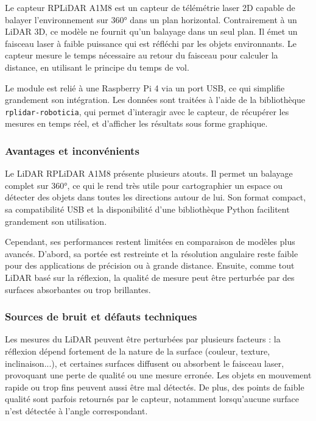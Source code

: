 Le capteur RPLiDAR A1M8 est un capteur de télémétrie laser 2D capable de balayer l’environnement sur 360° dans un plan horizontal. Contrairement à un LiDAR 3D, ce modèle ne fournit qu’un balayage dans un seul plan. Il émet un faisceau laser à faible puissance qui est réfléchi par les objets environnants. Le capteur mesure le temps nécessaire au retour du faisceau pour calculer la distance, en utilisant le principe du temps de vol.

Le module est relié à une Raspberry Pi 4 via un port USB, ce qui simplifie grandement son intégration. Les données sont traitées à l’aide de la bibliothèque \texttt{rplidar-roboticia}, qui permet d’interagir avec le capteur, de récupérer les mesures en temps réel, et d’afficher les résultats sous forme graphique.

\vspace{1em}
\subsubsection*{Avantages et inconvénients}

Le LiDAR RPLiDAR A1M8 présente plusieurs atouts. Il permet un balayage complet sur 360°, ce qui le rend très utile pour cartographier un espace ou détecter des objets dans toutes les directions autour de lui. Son format compact, sa compatibilité USB et la disponibilité d’une bibliothèque Python facilitent grandement son utilisation.

Cependant, ses performances restent limitées en comparaison de modèles plus avancés. D'abord, sa portée est restreinte et la résolution angulaire reste faible pour des applications de précision ou à grande distance. Ensuite, comme tout LiDAR basé sur la réflexion, la qualité de mesure peut être perturbée par des surfaces absorbantes ou trop brillantes.

\vspace{1em}
\subsubsection*{Sources de bruit et défauts techniques}

Les mesures du LiDAR peuvent être perturbées par plusieurs facteurs : la réflexion dépend fortement de la nature de la surface (couleur, texture, inclinaison...), et certaines surfaces diffusent ou absorbent le faisceau laser, provoquant une perte de qualité ou une mesure erronée. Les objets en mouvement rapide ou trop fins peuvent aussi être mal détectés. De plus, des points de faible qualité sont parfois retournés par le capteur, notamment lorsqu’aucune surface n’est détectée à l’angle correspondant.

